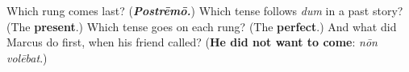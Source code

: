 \begin{tcolorbox}[breakable,colback=teal!4,colframe=teal!35!black,title={Before you move on}]
Which rung comes last? (\emph{\textbf{Postrēmō.}}) Which tense follows \emph{dum} in a past story? (The \textbf{present}.) Which tense goes on each rung? (The \textbf{perfect}.) And what did Marcus do first, when his friend called? (\textbf{He did not want to come}: \emph{nōn volēbat}.)
\end{tcolorbox}
